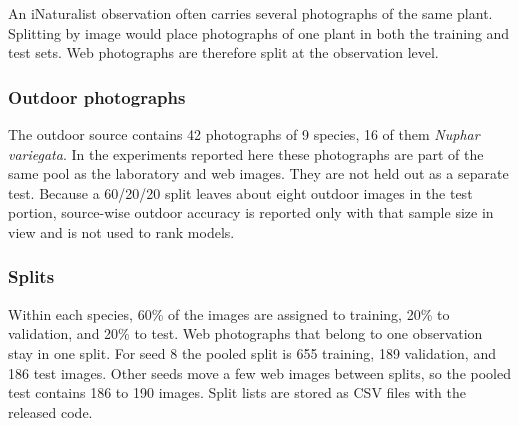 \documentclass[final,3p,times,twocolumn]{elsarticle}
\begin{document}
An iNaturalist observation often carries several photographs of the same plant. Splitting by image would place photographs of one plant in both the training and test sets. Web photographs are therefore split at the observation level.

\subsubsection{Outdoor photographs}
The outdoor source contains 42 photographs of 9 species, 16 of them \emph{Nuphar variegata}. In the experiments reported here these photographs are part of the same pool as the laboratory and web images. They are not held out as a separate test. Because a 60/20/20 split leaves about eight outdoor images in the test portion, source-wise outdoor accuracy is reported only with that sample size in view and is not used to rank models.

\subsubsection{Splits}
Within each species, 60\% of the images are assigned to training, 20\% to validation, and 20\% to test. Web photographs that belong to one observation stay in one split. For seed 8 the pooled split is 655 training, 189 validation, and 186 test images. Other seeds move a few web images between splits, so the pooled test contains 186 to 190 images. Split lists are stored as CSV files with the released code.
\end{document}
